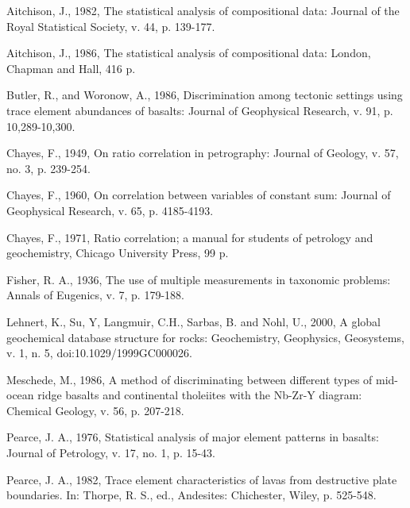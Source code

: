 \documentclass{article}
\begin{document}
\begin{description}

\item Aitchison,  J., 1982, The statistical  analysis of compositional
data: Journal of the Royal Statistical Society, v. 44, p. 139-177.

\item Aitchison,  J., 1986, The statistical  analysis of compositional
data: London, Chapman and Hall, 416 p.

\item Butler, R., and Woronow, A., 1986, Discrimination among tectonic
settings  using  trace  element  abundances  of  basalts:  Journal  of
Geophysical Research, v. 91, p. 10,289-10,300.

\item Chayes,  F., 1949, On ratio correlation  in petrography: Journal
of Geology, v. 57, no. 3, p. 239-254.

\item Chayes,  F., 1960, On correlation between  variables of constant
sum: Journal of Geophysical Research, v. 65, p. 4185-4193.

\item Chayes,  F., 1971, Ratio  correlation; a manual for  students of
petrology and geochemistry, Chicago University Press, 99 p.

\item  Fisher,  R. A.,  1936,  The  use  of multiple  measurements  in
taxonomic problems: Annals of Eugenics, v. 7, p. 179-188.

\item Lehnert,  K., Su,  Y, Langmuir, C.H.,  Sarbas, B. and  Nohl, U.,
2000, A global geochemical database structure for rocks: Geochemistry,
Geophysics, Geosystems, v. 1, n. 5, doi:10.1029/1999GC000026.

\item Meschede, M., 1986, A method of discriminating between different
types of  mid-ocean ridge basalts and continental  tholeiites with the
Nb-Zr-Y diagram: Chemical Geology, v. 56, p. 207-218.

\item  Pearce, J.  A.,  1976, Statistical  analysis  of major  element
patterns in basalts: Journal of Petrology, v. 17, no. 1, p. 15-43.

\item Pearce, J. A., 1982, Trace element characteristics of lavas from
destructive  plate boundaries.  In:  Thorpe, R.   S., ed.,  Andesites:
Chichester, Wiley, p. 525-548.


\end{description}
\end{document}

